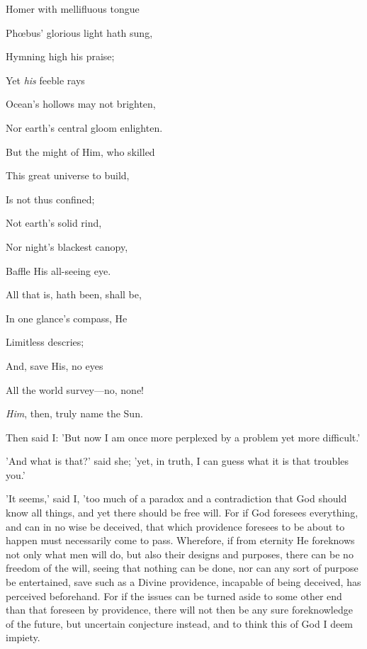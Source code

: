 
Homer with mellifluous tongue

Phœbus' glorious light hath sung,

Hymning high his praise;

Yet \emph{his} feeble rays

Ocean's hollows may not brighten,

Nor earth's central gloom enlighten.

But the might of Him, who skilled

This great universe to build,

Is not thus confined;

Not earth's solid rind,

Nor night's blackest canopy,

Baffle His all-seeing eye.

All that is, hath been, shall be,

In one glance's compass, He

Limitless descries;

And, save His, no eyes

All the world survey—no, none!

\emph{Him}, then, truly name the Sun.


Then said I: 'But now I am once more perplexed by a problem yet more
difficult.'

'And what is that?' said she; 'yet, in truth, I can guess what it is
that troubles you.'

'It seems,' said I, 'too much of a paradox and a contradiction that God
should know all things, and yet there should be free will. For if God
foresees everything, and can in no wise be deceived, that which
providence foresees to be about to happen must necessarily come to pass.
Wherefore, if from eternity He foreknows not only what men will do, but
also their designs and purposes, there can be no freedom of the will,
seeing that nothing can be done, nor can any sort of purpose be
entertained, save such as a Divine providence, incapable of being
deceived, has perceived beforehand. For if the issues can be turned
aside to some other end than that foreseen by providence, there will not
then be any sure foreknowledge of the future, but uncertain conjecture
instead, and to think this of God I deem impiety.

